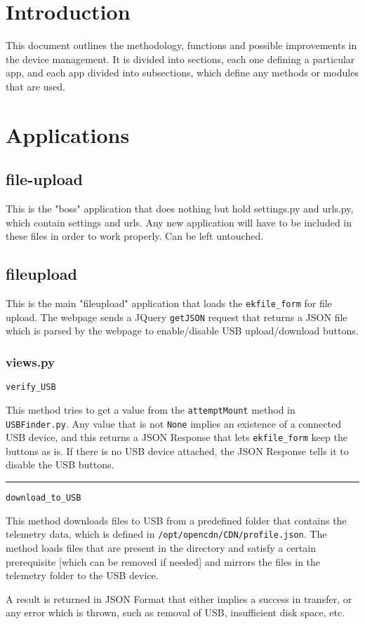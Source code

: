\documentclass[12pt]{article}
\title{}
\begin{document}
\section{\large{Introduction}}
{\normalsize 
	This document outlines the methodology, functions and possible improvements in the device management. It is divided into sections, each one defining a particular app, and each app divided into subsections, which define any methods or modules that are used.}
	
\section{\large{Applications}}
\subsection{file-upload}
{\normalsize
	This is the "boss" application that does nothing but hold settings.py and urls.py, which contain settings and urls. Any new application will have to be included in these files in order to work properly. Can be left untouched. }
	
\subsection{fileupload}
{\normalsize
	This is the main "fileupload" application that loads the \texttt{ekfile\_form} 
	for file upload. The webpage sends a JQuery \texttt{getJSON} request that returns a JSON file which is parsed by the webpage to enable/disable USB upload/download buttons. }
	
\subsubsection{views.py}
\texttt{verify\_USB}


{\normalsize
	This method tries to get a value from the \texttt {attemptMount} method in \texttt{USBFinder.py}. Any value that is not \texttt{None} implies an existence of a connected USB device, and this returns a JSON Response that lets \texttt{ekfile\_form} keep the buttons as is. If there is no USB device attached, the JSON Response tells it to disable the USB buttons.
}

\noindent\rule[0.5ex]{\linewidth}{0.5pt}
\texttt{download\_to\_USB}

{\normalsize
	This method downloads files to USB from a predefined folder that contains the telemetry data, which is defined in \texttt{/opt/opencdn/CDN/profile.json}. The method loads files that are present in the directory and satisfy a certain prerequisite [which can be removed if needed] and mirrors the files in the telemetry folder to the USB device.
	
	A result is returned in JSON Format that either implies a success in transfer, or any error which is thrown, such as removal of USB, insufficient disk space, etc. 
}
\end{document}
